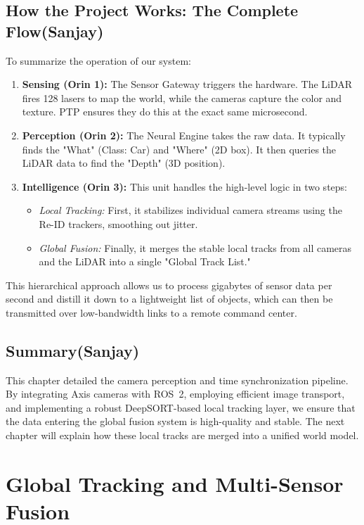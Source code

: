 \documentclass[12pt,a4paper]{report}
\begin{document}
{\section{How the Project Works: The Complete Flow(Sanjay)}
To summarize the operation of our system:
\begin{enumerate}
    \item \textbf{Sensing (Orin 1):} The Sensor Gateway triggers the hardware. The LiDAR fires 128 lasers to map the world, while the cameras capture the color and texture. PTP ensures they do this at the exact same microsecond.
    \item \textbf{Perception (Orin 2):} The Neural Engine takes the raw data. It typically finds the "What" (Class: Car) and "Where" (2D box). It then queries the LiDAR data to find the "Depth" (3D position).
    \item \textbf{Intelligence (Orin 3):} This unit handles the high-level logic in two steps:
    \begin{itemize}
        \item \textit{Local Tracking:} First, it stabilizes individual camera streams using the Re-ID trackers, smoothing out jitter.
        \item \textit{Global Fusion:} Finally, it merges the stable local tracks from all cameras and the LiDAR into a single "Global Track List."
    \end{itemize}
\end{enumerate}
This hierarchical approach allows us to process gigabytes of sensor data per second and distill it down to a lightweight list of objects, which can then be transmitted over low-bandwidth links to a remote command center.

\section{Summary(Sanjay)}
This chapter detailed the camera perception and time synchronization pipeline. By integrating Axis cameras with ROS~2, employing efficient image transport, and implementing a robust DeepSORT-based local tracking layer, we ensure that the data entering the global fusion system is high-quality and stable. The next chapter will explain how these local tracks are merged into a unified world model.

\chapter{Global Tracking and Multi-Sensor Fusion}

}
\end{document}
